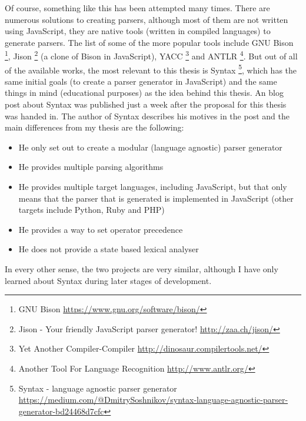 Of course, something like this has been attempted many times. There are numerous solutions to creating parsers, although most of them are not written using JavaScript, they are native tools (written in compiled languages) to generate parsers. The list of some of the more popular tools include GNU Bison \footnote{GNU Bison \url{https://www.gnu.org/software/bison/}}, Jison \footnote{Jison - Your friendly JavaScript parser generator! \url{http://zaa.ch/jison/}} (a clone of Bison in JavaScript), YACC \footnote{Yet Another Compiler-Compiler \url{http://dinosaur.compilertools.net/}} and ANTLR \footnote{Another Tool For Language Recognition \url{http://www.antlr.org/}}. But out of all of the available works, the most relevant to this thesis is Syntax \footnote{Syntax - language agnostic parser generator \url{https://medium.com/@DmitrySoshnikov/syntax-language-agnostic-parser-generator-bd24468d7cfc}}, which has the same initial goals (to create a parser generator in JavaScript) and the same things in mind (educational purposes) as the idea behind this thesis. An blog post about Syntax was published just a week after the proposal for this thesis was handed in. The author of Syntax describes his motives in the post and the main differences from my thesis are the following:
\begin{itemize}
\item He only set out to create a modular (language agnostic) parser generator
\item He provides multiple parsing algorithms
\item He provides multiple target languages, including JavaScript, but that only means that the parser that is generated is implemented in JavaScript (other targets include Python, Ruby and PHP)
\item He provides a way to set operator precedence
\item He does not provide a state based lexical analyser
\end{itemize}
In every other sense, the two projects are very similar, although I have only learned about Syntax during later stages of development.


